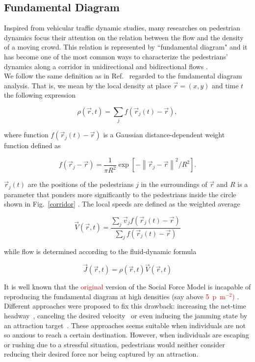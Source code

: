 \documentclass[preprint,12pt]{elsarticle}
\begin{document}
\subsection{\label{fundamental-diagram} Fundamental Diagram}

Inspired from vehicular traffic dynamic studies, many researches on pedestrian 
dynamics focus their attention on the relation between the flow and the density 
of a moving crowd. This relation is represented by ``fundamental diagram" and it 
has become one of the most common ways to characterize the pedestrians' dynamics 
along a corridor in unidirectional and bidirectional flows 
\cite{seyfried1,fruin1,mori1,polus1,jelic1}. \\

We follow the same definition as in Ref.~\cite{helbing3} regarded to the fundamental diagram analysis. That is, we mean by the local density at place $\vec{r}=(x,y)$ and time $t$ the following expression

\begin{equation}
\rho(\vec{r},t)=\sum_{j}f(\vec{r}_j(t)-\vec{r}), \label{ec-density}
\end{equation}

where function $f(\vec{r}_j(t)-\vec{r})$ is a Gaussian distance-dependent weight function defined as

\begin{equation}
f(\vec{r}_j-\vec{r})=\frac{1}{\pi R^2}\exp[-\left \| \vec{r}_j-\vec{r} \right \|^2/R^2]. \label{ec-f}
\end{equation}

$\vec{r}_j(t)$ are the positions of the pedestrians $j$ in the surroundings of $\vec{r}$ and $R$ is a parameter that ponders more significantly to the pedestrians inside the circle shown in Fig.~\ref{corridor} . 
The local speeds are defined as the weighted average  

\begin{equation}
\vec{V}(\vec{r},t)=\frac{\sum_j \vec{v}_jf(\vec{r}_j(t)-\vec{r}) }{\sum_j f(\vec{r}_j(t)-\vec{r}) } \label{ec-v}
\end{equation}

while flow is determined according to the fluid-dynamic formula

\begin{equation}
\vec{J}(\vec{r},t)=\rho(\vec{r},t)\vec{V}(\vec{r},t) \label{ec-flow}
\end{equation}

It is well known that the \textcolor{red}{original} version of the Social Force 
Model  is incapable of reproducing the 
fundamental diagram at high densities (say above 
\textcolor{red}{5~p~m$^{-2}$)} \textcolor{red}{\cite{parisi2}} . Different 
approaches were proposed to fix this drawback: increasing the net-time 
headway~\cite{johansson}, canceling the desired velocity~\cite{parisi2} or even 
inducing the jamming state by an attraction target~\cite{kwak}. These approaches 
seems suitable when individuals are not so anxious to reach a certain 
destination. However, when individuals are escaping or rushing due to a 
stressful situation, pedestrians would neither consider reducing their desired 
force nor being captured by an attraction. \\
\end{document}
